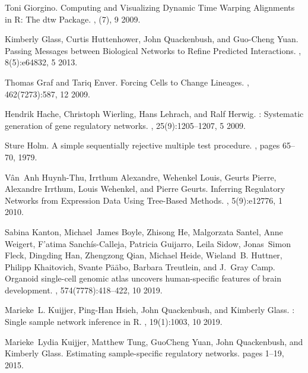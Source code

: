 \documentclass[10pt, a4paper]{article}
\begin{document}
\begin{thebibliography}{10}
	Toni Giorgino.
	\newblock Computing and {{Visualizing Dynamic Time Warping Alignments}} in
	{{R}}: {{The}} dtw {{Package}}.
	, (7), 9 2009.
	
	Kimberly Glass, Curtis Huttenhower, John Quackenbush, and Guo-Cheng Yuan.
	\newblock Passing {{Messages}} between {{Biological Networks}} to {{Refine
			Predicted Interactions}}.
	, 8(5):e64832, 5 2013.
	
	Thomas Graf and Tariq Enver.
	\newblock Forcing {{Cells}} to {{Change Lineages}}.
	, 462(7273):587, 12 2009.
	
	Hendrik Hache, Christoph Wierling, Hans Lehrach, and Ralf Herwig.
	: Systematic generation of gene regulatory networks.
	, 25(9):1205--1207, 5 2009.
	
	Sture Holm.
	\newblock A simple sequentially rejective multiple test procedure.
	, pages 65--70, 1979.
	
	V{\^a}n~Anh Huynh-Thu, Irrthum Alexandre, Wehenkel Louis, Geurts Pierre,
	Alexandre Irrthum, Louis Wehenkel, and Pierre Geurts.
	\newblock Inferring {{Regulatory Networks}} from {{Expression Data Using
			Tree}}-{{Based Methods}}.
	, 5(9):e12776, 1 2010.
	
	Sabina Kanton, Michael~James Boyle, Zhisong He, Malgorzata Santel, Anne
	Weigert, F{\a'a}tima Sanch\'is-Calleja, Patricia Guijarro, Leila Sidow,
	Jonas~Simon Fleck, Dingding Han, Zhengzong Qian, Michael Heide, Wieland~B.
	Huttner, Philipp Khaitovich, Svante P{\"a}{{\"a}}bo, Barbara Treutlein, and
	J.~Gray Camp.
	\newblock Organoid single-cell genomic atlas uncovers human-specific features
	of brain development.
	, 574(7778):418--422, 10 2019.
	
	Marieke~L. Kuijjer, Ping-Han Hsieh, John Quackenbush, and Kimberly Glass.
	: Single sample network inference in {{R}}.
	, 19(1):1003, 10 2019.
	
	Marieke~Lydia Kuijjer, Matthew Tung, GuoCheng Yuan, John Quackenbush, and
	Kimberly Glass.
	\newblock Estimating sample-specific regulatory networks.
	\newblock pages 1--19, 2015.
	

\end{thebibliography}
\end{document}
